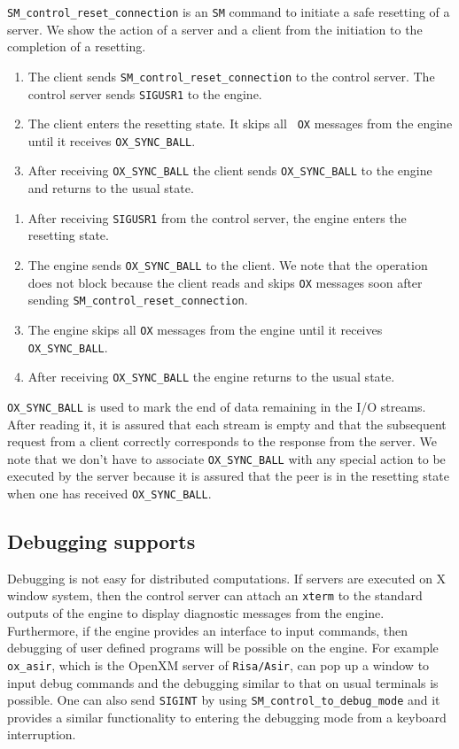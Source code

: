 {\tt SM\_control\_reset\_connection} is an {\tt SM} command to
initiate a safe resetting of a server. We show the action of 
a server and a client from the initiation to the completion of
a resetting.

\centerline{}

\begin{enumerate}
\item The client sends {\tt SM\_control\_reset\_connection} to the
control server. The control server sends {\tt SIGUSR1} to the engine.
\item The client enters the resetting state. It skips all {\tt
OX} messages from the engine until it receives {\tt OX\_SYNC\_BALL}.
\item After receiving {\tt OX\_SYNC\_BALL} the client sends 
{\tt OX\_SYNC\_BALL} to the engine and returns to the usual state.
\end{enumerate}

\centerline{}

\begin{enumerate}
\item After receiving {\tt SIGUSR1} from the control server,
the engine enters the resetting state.
\item The engine sends {\tt OX\_SYNC\_BALL} to the client.
We note that the operation does not block because
the client reads and skips {\tt OX} messages soon after sending
{\tt SM\_control\_reset\_connection}.
\item The engine skips all {\tt OX} messages from the engine until it
receives {\tt OX\_SYNC\_BALL}.
\item After receiving {\tt OX\_SYNC\_BALL} the engine returns to the
usual state.
\end{enumerate}

{\tt OX\_SYNC\_BALL} is used to mark the end of data remaining in the
I/O streams. After reading it, it is assured that each stream is empty
and that the subsequent request from a client correctly 
corresponds to the response from the server.
We note that we don't have to associate {\tt OX\_SYNC\_BALL} with
any special action to be executed by the server because it is
assured that the peer is in the resetting state when one has received
{\tt OX\_SYNC\_BALL}.

\subsection{Debugging supports}
Debugging is not easy for distributed computations.
If servers are executed on X window system, then the control server can
attach an {\tt xterm} to the standard outputs of the engine to display
diagnostic messages from the engine.
Furthermore, if the engine provides an interface to input commands,
then debugging of user defined programs will be
possible on the engine. For example {\tt ox\_asir}, which is
the OpenXM server of {\tt Risa/Asir}, can pop up a window to input
debug commands and the debugging similar to that on usual terminals is possible.
One can also send {\tt SIGINT} by using {\tt SM\_control\_to\_debug\_mode}
and it provides a similar functionality to entering the debugging
mode from a keyboard interruption.
